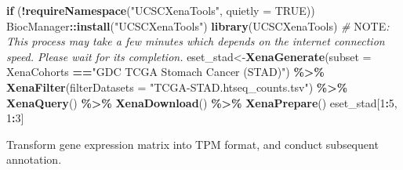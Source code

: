 \documentclass[
  12pt,
]{book}
\newenvironment{Shaded}{\begin{snugshade}}{\end{snugshade}}
\newcommand{\AlertTok}[1]{\textcolor[rgb]{0.94,0.16,0.16}{#1}}
\newcommand{\AttributeTok}[1]{\textcolor[rgb]{0.13,0.29,0.53}{#1}}
\newcommand{\CommentTok}[1]{\textcolor[rgb]{0.56,0.35,0.01}{\textit{#1}}}
\newcommand{\ConstantTok}[1]{\textcolor[rgb]{0.56,0.35,0.01}{#1}}
\newcommand{\ControlFlowTok}[1]{\textcolor[rgb]{0.13,0.29,0.53}{\textbf{#1}}}
\newcommand{\DecValTok}[1]{\textcolor[rgb]{0.00,0.00,0.81}{#1}}
\newcommand{\FunctionTok}[1]{\textcolor[rgb]{0.13,0.29,0.53}{\textbf{#1}}}
\newcommand{\NormalTok}[1]{#1}
\newcommand{\OtherTok}[1]{\textcolor[rgb]{0.56,0.35,0.01}{#1}}
\newcommand{\SpecialCharTok}[1]{\textcolor[rgb]{0.81,0.36,0.00}{\textbf{#1}}}
\newcommand{\StringTok}[1]{\textcolor[rgb]{0.31,0.60,0.02}{#1}}
\begin{document}
\begin{Shaded}
\begin{Highlighting}[]
\ControlFlowTok{if}\NormalTok{ (}\SpecialCharTok{!}\FunctionTok{requireNamespace}\NormalTok{(}\StringTok{"UCSCXenaTools"}\NormalTok{, }\AttributeTok{quietly =} \ConstantTok{TRUE}\NormalTok{))   BiocManager}\SpecialCharTok{::}\FunctionTok{install}\NormalTok{(}\StringTok{"UCSCXenaTools"}\NormalTok{)}
\FunctionTok{library}\NormalTok{(UCSCXenaTools)}
\CommentTok{\# }\AlertTok{NOTE}\CommentTok{: This process may take a few minutes which depends on the internet connection speed. Please wait for its completion.}
\NormalTok{eset\_stad}\OtherTok{\textless{}{-}}\FunctionTok{XenaGenerate}\NormalTok{(}\AttributeTok{subset =}\NormalTok{ XenaCohorts }\SpecialCharTok{==}\StringTok{"GDC TCGA Stomach Cancer (STAD)"}\NormalTok{) }\SpecialCharTok{\%\textgreater{}\%} 
  \FunctionTok{XenaFilter}\NormalTok{(}\AttributeTok{filterDatasets    =} \StringTok{"TCGA{-}STAD.htseq\_counts.tsv"}\NormalTok{) }\SpecialCharTok{\%\textgreater{}\%} 
  \FunctionTok{XenaQuery}\NormalTok{() }\SpecialCharTok{\%\textgreater{}\%}
  \FunctionTok{XenaDownload}\NormalTok{() }\SpecialCharTok{\%\textgreater{}\%} 
  \FunctionTok{XenaPrepare}\NormalTok{()}
\NormalTok{eset\_stad[}\DecValTok{1}\SpecialCharTok{:}\DecValTok{5}\NormalTok{, }\DecValTok{1}\SpecialCharTok{:}\DecValTok{3}\NormalTok{]}
\end{Highlighting}
\end{Shaded}

Transform gene expression matrix into TPM format, and conduct subsequent annotation.

\begin{Shaded}
\end{Shaded}
\end{document}
